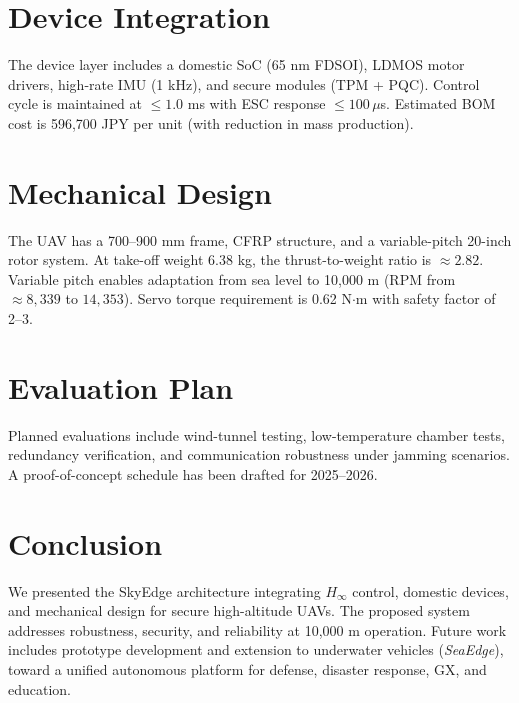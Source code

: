 \documentclass[conference]{IEEEtran}
\begin{document}
\section{Device Integration}
The device layer includes a domestic SoC (65 nm FDSOI), LDMOS motor 
drivers, high-rate IMU (1 kHz), and secure modules (TPM + PQC). 
Control cycle is maintained at $\leq 1.0$ ms with ESC response $\leq 100 
\, \mu$s. Estimated BOM cost is 596,700 JPY per unit (with reduction in 
mass production).

\section{Mechanical Design}
The UAV has a 700--900 mm frame, CFRP structure, and a variable-pitch 
20-inch rotor system. At take-off weight 6.38 kg, the thrust-to-weight 
ratio is $\approx 2.82$. Variable pitch enables adaptation from sea 
level to 10,000 m (RPM from $\approx 8,339$ to $14,353$). Servo torque 
requirement is 0.62 N$\cdot$m with safety factor of 2--3.

\section{Evaluation Plan}
Planned evaluations include wind-tunnel testing, low-temperature chamber 
tests, redundancy verification, and communication robustness under 
jamming scenarios. A proof-of-concept schedule has been drafted for 
2025--2026.

\section{Conclusion}
We presented the SkyEdge architecture integrating $H_\infty$ control, 
domestic devices, and mechanical design for secure high-altitude UAVs. 
The proposed system addresses robustness, security, and reliability at 
10,000 m operation. Future work includes prototype development and 
extension to underwater vehicles (\emph{SeaEdge}), toward a unified 
autonomous platform for defense, disaster response, GX, and education.



\end{document}
